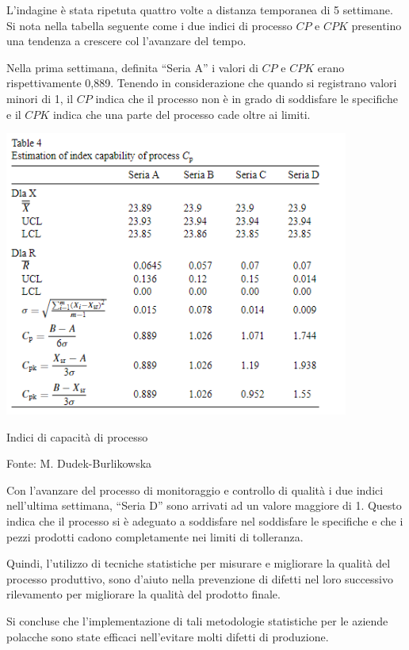 L'indagine è stata ripetuta quattro volte a distanza temporanea di 5 settimane. 
Si nota nella tabella seguente come i due indici di processo $CP$ e $CPK$ presentino una tendenza a crescere col l'avanzare del tempo.


Nella prima settimana, definita ``Seria A'' i valori di $CP$ e $CPK$ erano rispettivamente 0,889.
Tenendo in considerazione che quando si registrano valori minori di 1, il $CP$ indica che il processo non è in grado di soddisfare le specifiche e il $CPK$ indica che una parte del processo cade oltre ai limiti.

\begin{table}[h]
  \centering
  \includegraphics[width=0.85\textwidth]{img/review.png}
  \caption{Indici di capacità di processo} 
  {Fonte: M. Dudek-Burlikowska}
  \label{fig:cp-cpk-review.png}
\end{table}

Con l'avanzare del processo di monitoraggio e controllo di qualità i due indici nell'ultima settimana, ``Seria D'' sono arrivati ad un valore maggiore di 1. 
Questo indica che il processo si è adeguato a soddisfare nel soddisfare le specifiche e che i pezzi prodotti cadono completamente nei limiti di tolleranza. 
\cite{qualityi}


Quindi, l'utilizzo di tecniche statistiche per misurare e migliorare la qualità del processo produttivo, sono d'aiuto nella prevenzione di difetti nel loro successivo rilevamento per migliorare la qualità del prodotto finale.

Si concluse che l'implementazione di tali metodologie statistiche per le aziende polacche sono state efficaci nell'evitare molti difetti di produzione.   
\cite{DUDEKBURLIKOWSKA2005736}


